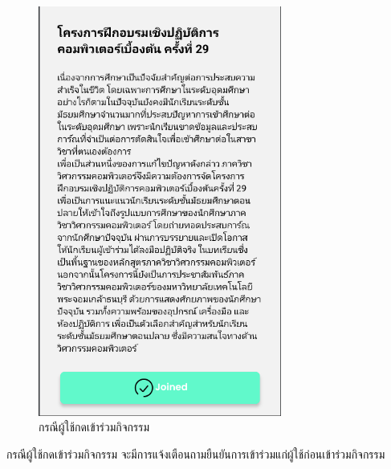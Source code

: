 \documentclass[14pt,oneside,openright,a4paper]{cpe-thai-project}
\begin{document}
\begin{figure}[!h]\centering
  \includegraphics[width=8cm]{./Pictures/Scene7.png}
  \caption{กรณีผู้ใช้กดเข้าร่วมกิจกรรม}\label{fig:JoinEventTest}
\end{figure}
  \hspace*{1cm} กรณีผู้ใช้กดเข้าร่วมกิจกรรม จะมีการแจ้งเตือนถามยืนยันการเข้าร่วมแก่ผู้ใช้ก่อนเข้าร่วมกิจกรรม

\newpage
\end{document}
